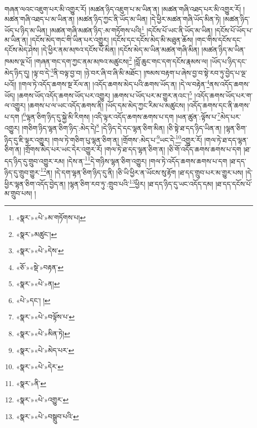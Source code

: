 གཞན་ལའང་འཇུག་པར་མི་འགྱུར་རོ། །མཚན་ཉིད་འཇུག་པ་མ་ཡིན་ན། །མཚན་གཞི་འཐད་པར་མི་འགྱུར་རོ། །མཚན་གཞི་འཐད་པ་མ་ཡིན་ན། །མཚན་ཉིད་ཀྱང་ནི་ཡོད་མ་ཡིན། །དེ་ཕྱིར་མཚན་གཞི་ཡོད་མིན་ཏེ། །མཚན་ཉིད་ཡོད་པ་ཉིད་མ་ཡིན། །མཚན་གཞི་མཚན་ཉིད་:མ་གཏོགས་པའི།\footnote{«སྣར་»«པེ་»མ་གཏོགས་པ།} །དངོས་པོ་ཡང་ནི་ཡོད་མ་ཡིན། །དངོས་པོ་ཡོད་པ་མ་ཡིན་ན། །དངོས་མེད་གང་གི་ཡིན་པར་འགྱུར། །དངོས་དང་དངོས་མེད་མི་མཐུན་ཆོས། །གང་གིས་དངོས་དང་དངོས་མེད་ཤེས། །དེ་ཕྱིར་ནམ་མཁའ་དངོས་པོ་མིན། །དངོས་མེད་མ་ཡིན་མཚན་གཞི་མིན། །མཚན་ཉིད་མ་ཡིན་ཁམས་ལྔ་པོ། །གཞན་གང་དག་ཀྱང་ནམ་མཁའ་མཚུངས།\footnote{«སྣར་»མཚུང་།} །བློ་ཆུང་གང་དག་དངོས་རྣམས་ལ། །ཡོད་པ་ཉིད་དང་མེད་ཉིད་དུ། །ལྟ་བ་དེ་\footnote{«སྣར་»«པེ་»དེས་}ནི་བལྟ་བྱ་བ། །ཉེ་བར་ཞི་བ་ཞི་མི་མཐོང་། །ཁམས་བརྟག་པ་ཞེས་བྱ་བ་སྟེ་རབ་ཏུ་བྱེད་པ་ལྔ་པའོ།། །།གལ་ཏེ་འདོད་ཆགས་སྔ་རོལ་ན། །འདོད་ཆགས་མེད་པའི་ཆགས་ཡོད་ན། །དེ་ལ་བརྟེན་\footnote{«ཅོ་»«སྡེ་»བརྟན་}ནས་འདོད་ཆགས་ཡོད། །ཆགས་ཡོད་འདོད་ཆགས་ཡོད་པར་འགྱུར། །ཆགས་པ་ཡོད་པར་མ་གྱུར་ནའང་།\footnote{«སྣར་»«པེ་»ན།} །འདོད་ཆགས་ཡོད་པར་ག་ལ་འགྱུར། །ཆགས་པ་ལ་ཡང་འདོད་ཆགས་ནི། །ཡོད་དམ་མེད་ཀྱང་རིམ་པ་མཚུངས། །འདོད་ཆགས་དང་ནི་ཆགས་པ་དག །\footnote{«པེ་»དང་། །}ལྷན་ཅིག་ཉིད་དུ་སྐྱེ་མི་རིགས། །འདི་ལྟར་འདོད་ཆགས་ཆགས་པ་དག །ཕན་ཚུན་:ལྟོས་པ་\footnote{«སྣར་»«པེ་»བལྟོས་པ་}མེད་པར་འགྱུར། །གཅིག་ཉིད་ལྷན་ཅིག་ཉིད་:མེད་དེ།\footnote{«སྣར་»«པེ་»མིན་ཏེ།} །དེ་ཉིད་དེ་དང་ལྷན་ཅིག་མིན། །ཅི་སྟེ་ཐ་དད་ཉིད་ཡིན་ན། །ལྷན་ཅིག་ཉིད་དུ་ཇི་ལྟར་འགྱུར། །གལ་ཏེ་གཅིག་པུ་ལྷན་ཅིག་ན། །གྲོགས་:མེད་པ་\footnote{«སྣར་»«པེ་»མེད་པར་}ཡང་དེ་\footnote{«སྣར་»«པེ་»དེར་}འགྱུར་རོ། །གལ་ཏེ་ཐ་དད་ལྷན་ཅིག་ན། །གྲོགས་མེད་པར་ཡང་དེར་འགྱུར་རོ། །གལ་ཏེ་ཐ་དད་ལྷན་ཅིག་ན། །ཅི་གོ་འདོད་ཆགས་ཆགས་པ་དག །ཐ་དད་ཉིད་དུ་གྲུབ་འགྱུར་རམ། །དེས་ན་\footnote{«སྣར་»ནི་}དེ་གཉིས་ལྷན་ཅིག་འགྱུར། །གལ་ཏེ་འདོད་ཆགས་ཆགས་པ་དག །ཐ་དད་ཉིད་དུ་གྲུབ་གྱུར་\footnote{«སྣར་»«པེ་»འགྱུར་}ན། །དེ་དག་ལྷན་ཅིག་ཉིད་དུ་ནི། །ཅི་ཡི་ཕྱིར་ན་ཡོངས་སུ་རྟོག །ཐ་དད་གྲུབ་པར་མ་གྱུར་པས། །དེ་ཕྱིར་ལྷན་ཅིག་འདོད་བྱེད་ན། །ལྷན་ཅིག་རབ་ཏུ་:གྲུབ་པའི་\footnote{«སྣར་»«པེ་»བསྒྲུབ་པའི་}ཕྱིར། །ཐ་དད་ཉིད་དུ་ཡང་འདོད་དམ། །ཐ་དད་དངོས་པོ་མ་གྲུབ་པས། །
